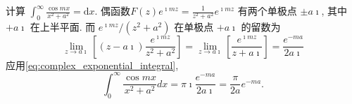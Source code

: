 \begin{examplebox}{计算 $\int_0^{\infty} \frac{\cos m x}{x^2+a^2}=\mathrm{d} x$.}
偶函数$F(z) e^{\imath m z}=\frac{1}{z^2+a^2} e^{\imath m z}$ 有两个单极点 $\pm a \imath$, 其中 $+a \imath$ 在上半平面. 而 $e^{\imath m z} /\left(z^2+a^2\right)$ 在单极点 $+a \imath$ 的留数为
    $$
    \lim _{z \rightarrow a \imath}\left[(z-a \imath) \frac{e^{\imath m z}}{z^2+a^2}\right]=\lim _{z \rightarrow a \imath}\left[\frac{e^{\imath m z}}{z+a \imath}\right]=\frac{e^{-m a}}{2 a \imath}
    $$
    应用\ref{eq:complex_exponential_integral},
    $$
    \int_0^{\infty} \frac{\cos m x}{x^2+a^2} d x=\pi \imath \frac{e^{-m a}}{2 a \imath}=\frac{\pi}{2 a} e^{-m a}.
    $$
\end{examplebox}